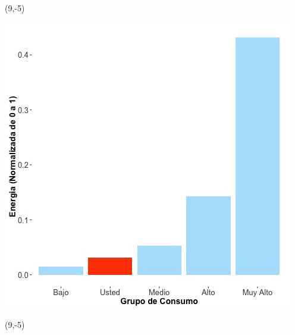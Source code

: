\documentclass{article}\usepackage[]{graphicx}\usepackage[]{color}
\newenvironment{knitrout}{}{} %
\begin{document}
 \begin{textblock}{1}(9,-5)
\begin{minipage}{20em}
\begingroup

\endgroup
\end{minipage}
\end{textblock}


\begin{knitrout}
\color{fgcolor}
\includegraphics[scale=0.65]{figure/A22_neighbor_plot} 
\end{knitrout}

 \begin{textblock}{1}(9,-5)
\begin{minipage}{20em}
\begingroup

\endgroup
\end{minipage}
\end{textblock}
\end{document}
